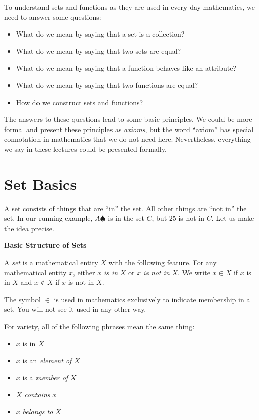 To understand sets and functions as they are used in every day mathematics, we need to answer some questions:
\begin{itemize}
	\item What do we mean by saying that a set is a collection?
	\item What do we mean by saying that two sets are equal?
	\item What do we mean by saying that a function behaves like an attribute?
	\item What do we mean by saying that two functions are equal?
	\item How do we construct sets and functions?
\end{itemize}
The answers to these questions lead to some basic principles.
We could be more formal and present these principles as \emph{axioms}, but the word ``axiom'' has special connotation in mathematics that we do not need here.
Nevertheless, everything we say in these lectures could be presented formally.  

\section{Set Basics}

A set consists of things that are ``in'' the set. All other things are ``not in'' the set. In our running example, $A\spadesuit$ is in the set $C$, but $25$ is not in $C$. Let us make the idea precise.

\begin{principle}\label{sig:SetSignature}
 
 \noindent\textbf{Basic Structure of Sets}
 
  A \emph{set} is a mathematical entity $X$ with the following feature. 
  For any mathematical entity $x$, either $x$ \emph{is in} $X$ or $x$ \emph{is not in} $X$. 
  We write $x\in X$ if $x$ is in $X$ and $x\notin X$ if $x$ is not in $X$.
\end{principle}

The symbol $\in$ is used in mathematics exclusively to indicate membership in a set. 
You will not see it used in any other way.  

For variety, all of the following phrases mean the same thing:
\begin{itemize}
\item $x$ is in $X$
\item $x$ is an \emph{element of} $X$
\item $x$  is a \emph{member of} $X$
\item $X$ \emph{contains} $x$
\item $x$ \emph{belongs to} $X$
\end{itemize}

